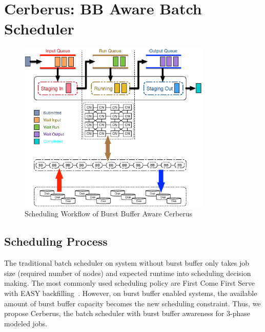 \section{Cerberus: BB Aware Batch Scheduler}
\label{Sec:Scheduler}

\begin{figure}[!htbp]
        \centering
        \includegraphics[width=3.6in]{CerberusBBSystem}
        \caption{Scheduling Workflow of Burst Buffer Aware Cerberus}
        \label{Fig:CerberusQueues}
\end{figure}

\subsection{Scheduling Process}

The traditional batch scheduler on system without burst buffer only
takes job size (required number of nodes) and expected runtime into scheduling decision making. 
The most commonly used scheduling policy are First Come First Serve with EASY backfilling~\cite{tsafrir-tpds-2007}.
However, on burst buffer enabled systems, 
the available amount of burst buffer capacity becomes the new scheduling constraint. 
Thus, we propose Cerberus, 
the batch scheduler with burst buffer awareness for 3-phase modeled jobs. 

